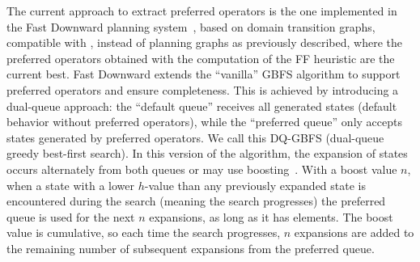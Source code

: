 \documentclass[ppgc,diss,english]{iiufrgs}
\begin{document}
The current approach to extract preferred operators is the one implemented in the Fast Downward planning system~\cite{Helmert/2009}, based on domain transition graphs, compatible with \sas, instead of planning graphs as previously described, where the preferred operators obtained with the computation of the FF heuristic are the current best.
Fast Downward extends the ``vanilla'' GBFS algorithm to support preferred operators and ensure completeness. This is achieved by introducing a dual-queue approach: the ``default queue'' receives all generated states (default behavior without preferred operators), while the ``preferred queue'' only accepts states generated by preferred operators. We call this DQ-GBFS (dual-queue greedy best-first search). In this version of the algorithm, the expansion of states occurs alternately from both queues or may use boosting~\cite{Richter.Helmert/2009}.
With a boost value $n$, when a state with a lower $h$-value than any previously expanded state is encountered during the search (meaning the search progresses) the preferred queue is used for the next $n$ expansions, as long as it has elements. The boost value is cumulative, so each time the search progresses, $n$ expansions are added to the remaining number of subsequent expansions from the preferred queue.
\end{document}
